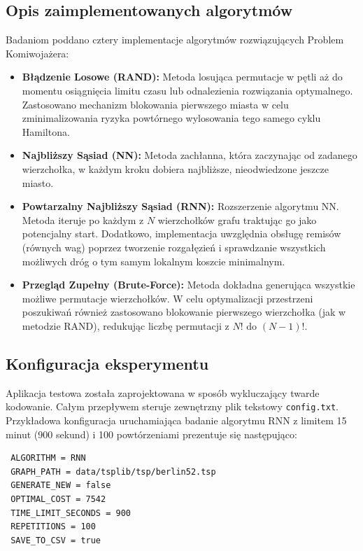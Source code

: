 \documentclass[conference]{IEEEtran}
\begin{document}
        \subsection{Opis zaimplementowanych algorytmów}
            Badaniom poddano cztery implementacje algorytmów rozwiązujących Problem Komiwojażera:
            \begin{itemize}
                \item \textbf{Błądzenie Losowe (RAND):} Metoda losująca permutacje w pętli aż do momentu osiągnięcia limitu czasu lub odnalezienia rozwiązania optymalnego. Zastosowano mechanizm blokowania pierwszego miasta w celu zminimalizowania ryzyka powtórnego wylosowania tego samego cyklu Hamiltona.
                \item \textbf{Najbliższy Sąsiad (NN):} Metoda zachłanna, która zaczynając od zadanego wierzchołka, w każdym kroku dobiera najbliższe, nieodwiedzone jeszcze miasto.
                \item \textbf{Powtarzalny Najbliższy Sąsiad (RNN):} Rozszerzenie algorytmu NN. Metoda iteruje po każdym z $N$ wierzchołków grafu traktując go jako potencjalny start. Dodatkowo, implementacja uwzględnia obsługę remisów (równych wag) poprzez tworzenie rozgałęzień i sprawdzanie wszystkich możliwych dróg o tym samym lokalnym koszcie minimalnym.
                \item \textbf{Przegląd Zupełny (Brute-Force):} Metoda dokładna generująca wszystkie możliwe permutacje wierzchołków. W celu optymalizacji przestrzeni poszukiwań również zastosowano blokowanie pierwszego wierzchołka (jak w metodzie RAND), redukując liczbę permutacji z $N!$ do $(N-1)!$.
            \end{itemize}
        \subsection{Konfiguracja eksperymentu}
            Aplikacja testowa została zaprojektowana w sposób wykluczający twarde kodowanie. Całym przepływem steruje zewnętrzny plik tekstowy \texttt{config.txt}. Przykładowa konfiguracja uruchamiająca badanie algorytmu RNN z limitem 15 minut (900 sekund) i 100 powtórzeniami prezentuje się następująco:
\begin{verbatim}
 ALGORITHM = RNN
 GRAPH_PATH = data/tsplib/tsp/berlin52.tsp
 GENERATE_NEW = false
 OPTIMAL_COST = 7542
 TIME_LIMIT_SECONDS = 900
 REPETITIONS = 100
 SAVE_TO_CSV = true
\end{verbatim}
\end{document}
